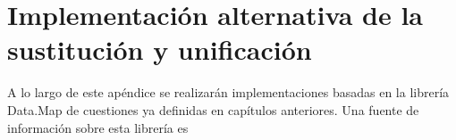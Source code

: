 \appendix

\chapter{Implementación alternativa de la sustitución y unificación} \label{aped.A}

A lo largo de este apéndice se realizarán implementaciones basadas en la librería Data.Map de cuestiones ya definidas en capítulos anteriores. Una fuente de información sobre esta librería es \cite{map}


